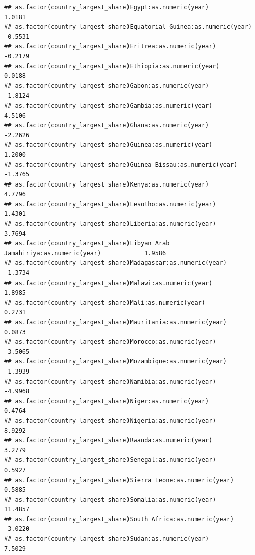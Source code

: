 \documentclass[
  a4paper,
]{article}
\begin{document}
\begin{verbatim}
## as.factor(country_largest_share)Egypt:as.numeric(year)                             1.0181
## as.factor(country_largest_share)Equatorial Guinea:as.numeric(year)                -0.5531
## as.factor(country_largest_share)Eritrea:as.numeric(year)                          -0.2179
## as.factor(country_largest_share)Ethiopia:as.numeric(year)                          0.0188
## as.factor(country_largest_share)Gabon:as.numeric(year)                            -1.8124
## as.factor(country_largest_share)Gambia:as.numeric(year)                            4.5106
## as.factor(country_largest_share)Ghana:as.numeric(year)                            -2.2626
## as.factor(country_largest_share)Guinea:as.numeric(year)                            1.2000
## as.factor(country_largest_share)Guinea-Bissau:as.numeric(year)                    -1.3765
## as.factor(country_largest_share)Kenya:as.numeric(year)                             4.7796
## as.factor(country_largest_share)Lesotho:as.numeric(year)                           1.4301
## as.factor(country_largest_share)Liberia:as.numeric(year)                           3.7694
## as.factor(country_largest_share)Libyan Arab Jamahiriya:as.numeric(year)            1.9586
## as.factor(country_largest_share)Madagascar:as.numeric(year)                       -1.3734
## as.factor(country_largest_share)Malawi:as.numeric(year)                            1.8985
## as.factor(country_largest_share)Mali:as.numeric(year)                              0.2731
## as.factor(country_largest_share)Mauritania:as.numeric(year)                        0.0873
## as.factor(country_largest_share)Morocco:as.numeric(year)                          -3.5065
## as.factor(country_largest_share)Mozambique:as.numeric(year)                       -1.3939
## as.factor(country_largest_share)Namibia:as.numeric(year)                          -4.9968
## as.factor(country_largest_share)Niger:as.numeric(year)                             0.4764
## as.factor(country_largest_share)Nigeria:as.numeric(year)                           8.9292
## as.factor(country_largest_share)Rwanda:as.numeric(year)                            3.2779
## as.factor(country_largest_share)Senegal:as.numeric(year)                           0.5927
## as.factor(country_largest_share)Sierra Leone:as.numeric(year)                      0.5885
## as.factor(country_largest_share)Somalia:as.numeric(year)                          11.4857
## as.factor(country_largest_share)South Africa:as.numeric(year)                     -3.0220
## as.factor(country_largest_share)Sudan:as.numeric(year)                             7.5029

\end{verbatim}
\end{document}
